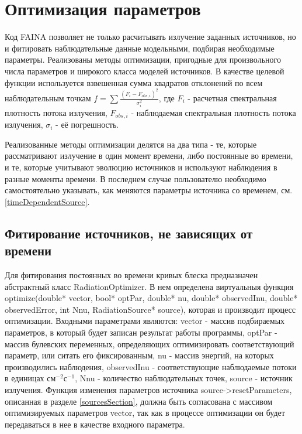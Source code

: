 \chapter{Оптимизация параметров}\label{optimization}
Код FAINA позволяет не только расчитывать излучение заданных источников, но и фитировать наблюдательные данные модельными, подбирая необходимые параметры. Реализованы методы оптимизации, пригодные для произвольного числа параметров и широкого класса моделей источников. В качестве целевой функции используется взвешенная сумма квадратов отклонений по всем наблюдательным точкам $f = \sum \frac{(F_i - F_{obs,i})^2}{\sigma_i^2}$, где $F_i$ - расчетная спектральная плотность потока излучения, $F_{obs,i}$ - наблюдаемая спектральная плотность потока излучения, $\sigma_i$ - её погрешность. 

Реализованные методы оптимизации делятся на два типа - те, которые рассматривают излучение в один момент времени, либо постоянные во времени, и те, которые учитывают эволюцию источников и используют наблюдения в разные моменты времени. В последнем случае пользователю необходимо самостоятельно указывать, как меняются параметры источника со временем, см. \ref{timeDependentSource}.

\section{Фитирование источников, не зависящих от времени}
Для фитирования постоянных во времени кривых блеска предназначен абстрактный класс RadiationOptimizer. В нем определена виртуальныя функция optimize(double* vector, bool* optPar, double* nu, double* observedInu, double* observedError, int Nnu, RadiationSource* source), которая и производит процесс оптимизации. Входными параметрами являются: vector - массив подбираемых параметров, в который будет записан результат работы программы, optPar - массив булевских переменных, определяющих оптимизировать соответствующий параметр, или ситать его фиксированным, nu - массив энергий, на которых производились наблюдения, observedInu - соответствующие наблюдаемые потоки в единицах $\text{см}^{-2}\text{с}^{-1}$, Nnu - количество наблюдательных точек, source - источник излучения. Функция изменения параметров источника source->resetParameters, описанная в разделе \ref{sourcesSection}, должна быть согласована с массивом оптимизируемых параметров vector, так как в процессе оптимизации он будет передаваться в нее в качестве входного параметра.

